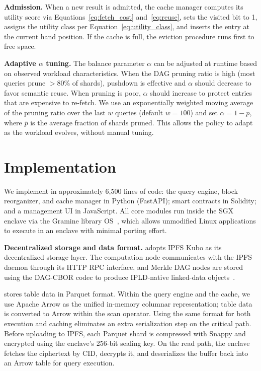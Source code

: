 \textbf{Admission.}
When a new result is admitted, the cache manager computes its utility score via Equations~\ref{eq:fetch_cost} and~\ref{eq:reuse}, sets the visited bit to 1, assigns the utility class per Equation~\ref{eq:utility_class}, and inserts the entry at the current hand position.
If the cache is full, the eviction procedure runs first to free space.

\textbf{Adaptive $\alpha$ tuning.}
The balance parameter $\alpha$ can be adjusted at runtime based on observed workload characteristics.
When the DAG pruning ratio is high (most queries prune $>$80\% of shards), pushdown is effective and $\alpha$ should decrease to favor semantic reuse.
When pruning is poor, $\alpha$ should increase to protect entries that are expensive to re-fetch.
We use an exponentially weighted moving average of the pruning ratio over the last $w$ queries (default $w = 100$) and set $\alpha = 1 - \bar{p}$, where $\bar{p}$ is the average fraction of shards pruned.
This allows the policy to adapt as the workload evolves, without manual tuning.


\section{Implementation}
\label{sec:implementation}

We implement \ours{} in approximately 6{,}500 lines of code: the query engine, block reorganizer, and cache manager in Python (FastAPI); smart contracts in Solidity; and a management UI in JavaScript.
All core modules run inside the SGX enclave via the Gramine library OS~\cite{tsai2017graphene,kuvaiskii2022computation}, which allows unmodified Linux applications to execute in an enclave with minimal porting effort.

\textbf{Decentralized storage and data format.}
\ours{} adopts IPFS Kubo as its decentralized storage layer.
The computation node communicates with the IPFS daemon through its HTTP RPC interface, and Merkle DAG nodes are stored using the DAG-CBOR codec to produce IPLD-native linked-data objects~\cite{ipld2023spec}.

\ours{} stores table data in Parquet format.
Within the query engine and the cache, we use Apache Arrow as the unified in-memory columnar representation; table data is converted to Arrow within the scan operator.
Using the same format for both execution and caching eliminates an extra serialization step on the critical path.
Before uploading to IPFS, each Parquet shard is compressed with Snappy and encrypted using the enclave's 256-bit sealing key.
On the read path, the enclave fetches the ciphertext by CID, decrypts it, and deserializes the buffer back into an Arrow table for query execution.

